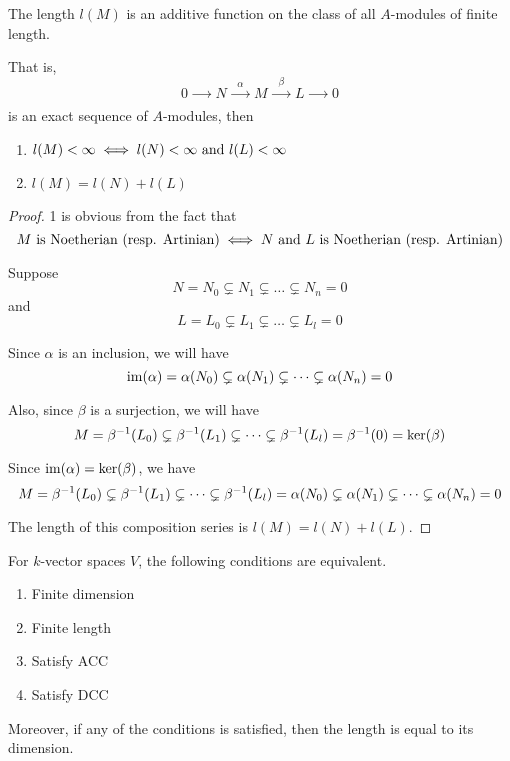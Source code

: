 \begin{proposition}{}{}
	The length \(l(M)\) is an additive function on the class of all
	\(A\)-modules of finite length.

	That is,
	\[
		0 \xrightarrow[\quad\quad]{} N
		\xrightarrow[\quad\quad]{\alpha} M
		\xrightarrow[\quad\quad]{\beta} L
		\xrightarrow[\quad\quad]{} 0
	\]
	is an exact sequence of \(A\)-modules, then
	\begin{enumerate}
		\item \(l(M) < \infty \iff l(N) < \infty \text{ and } l(L) < \infty\)
		\item \(l(M) = l(N) + l(L)\)
	\end{enumerate}
\end{proposition}

\begin{proof}
	1 is obvious from the fact that
	\[
		M \text{ is Noetherian (resp. Artinian)}
		\iff N \text{ and } L \text{ is Noetherian (resp. Artinian)}
	\]

	Suppose
	\[
		N = N_0 \subsetneq N_1 \subsetneq \dots \subsetneq N_n = 0
	\]
	and
	\[
		L = L_0 \subsetneq L_1 \subsetneq \dots \subsetneq L_l = 0
	\]

	Since \(\alpha\) is an inclusion, we will have
	\[
		\operatorname{im}(\alpha) = \alpha(N_0) \subsetneq \alpha(N_1) \subsetneq \dots
		\subsetneq \alpha(N_n) = 0
	\]

	Also, since \(\beta\) is a surjection, we will have
	\[
		M = \beta^{-1}(L_0) \subsetneq \beta^{-1}(L_1) \subsetneq \dots
		\subsetneq \beta^{-1}(L_l) = \beta^{-1}(0) = \ker(\beta)
	\]

	Since \(\operatorname{im}(\alpha) = \ker(\beta)\), we have
	\[
		M = \beta^{-1}(L_0) \subsetneq \beta^{-1}(L_1) \subsetneq \dots
		\subsetneq \beta^{-1}(L_l) = \alpha(N_0) \subsetneq \alpha(N_1)
		\subsetneq \dots \subsetneq \alpha(N_n) = 0
	\]

	The length of this composition series is \(l(M) = l(N) + l(L)\).
\end{proof}


\begin{proposition}{}{}
	For \(k\)-vector spaces \(V\), the following conditions are equivalent.
	\begin{enumerate}
		\item Finite dimension
		\item Finite length
		\item Satisfy ACC
		\item Satisfy DCC
	\end{enumerate}
	Moreover, if any of the conditions is satisfied, then the length
	is equal to its dimension.
\end{proposition}

